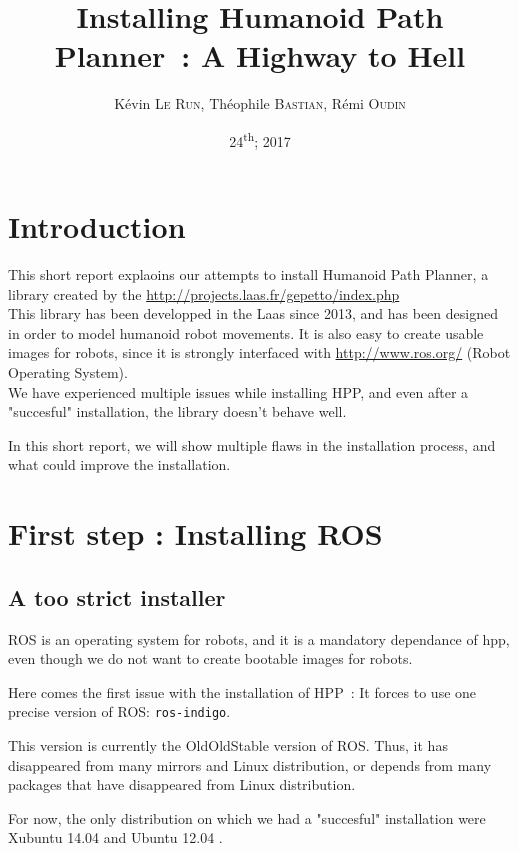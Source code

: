 \documentclass[a4paper, 11pt, titlepage]{article}
\author{Kévin \textsc{Le Run}, Théophile \textsc{Bastian}, Rémi \textsc{Oudin}}
\title{Installing Humanoid Path Planner~: A Highway to Hell}
\date{24\textsuperscript{th}; 2017}
\begin{document}
\maketitle

\tableofcontents

\newpage

\section*{Introduction}
\label{sec:intro}

This short report explaoins our attempts to install Humanoid Path Planner,
a library created by the \url{http://projects.laas.fr/gepetto/index.php}\\

This library has been developped in the Laas since 2013, and has been designed
in order to model humanoid robot movements. It is also easy to create usable
images for robots, since it is strongly interfaced with
\url{http://www.ros.org/} (Robot Operating System).\\

We have experienced multiple issues while installing HPP, and even after a
"succesful" installation, the library doesn't behave well.

In this short report, we will show multiple flaws in the installation process,
and what could improve the installation.

\section{First step : Installing ROS}

\subsection{A too strict installer}
ROS is an operating system for robots, and it is a mandatory dependance of hpp,
even though we do not want to create bootable images for robots.

Here comes the first issue with the installation of HPP~: It forces to use one
precise version of ROS: \verb|ros-indigo|.

This version is currently the OldOldStable version of ROS. Thus, it has
disappeared from many mirrors and Linux distribution, or depends from many
packages that have disappeared from Linux distribution.

For now, the only distribution on which we had a "succesful" installation were
Xubuntu 14.04 and Ubuntu 12.04 .
\end{document}
